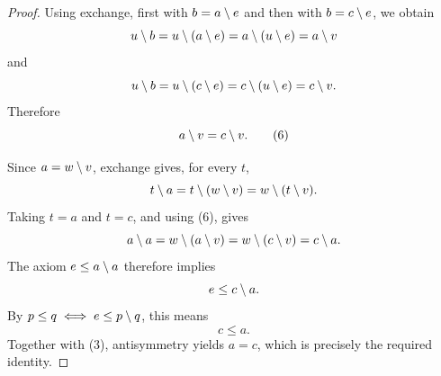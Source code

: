 \documentclass{article}
\theoremstyle{definition}
\begin{document}
\begin{proof}
Using exchange, first with \(b=a\res e\) and then with
\(b=c\res e\), we obtain
\[
u\res b
 =u\res(a\res e)
 =a\res(u\res e)
 =a\res v
\]
and
\[
u\res b
 =u\res(c\res e)
 =c\res(u\res e)
 =c\res v.
\]
Therefore
\begin{equation}
a\res v=c\res v.
\tag{6}
\end{equation}

Since \(a=w\res v\), exchange gives, for every \(t\),
\[
t\res a
 =t\res(w\res v)
 =w\res(t\res v).
\]
Taking \(t=a\) and \(t=c\), and using (6), gives
\[
a\res a
 =w\res(a\res v)
 =w\res(c\res v)
 =c\res a.
\]
The axiom \(e\leq a\res a\) therefore implies
\[
e\leq c\res a.
\]
By \(p\leq q\iff e\leq p\res q\), this means
\[
c\leq a.
\]
Together with (3), antisymmetry yields \(a=c\), which is precisely
the required identity.
\end{proof}
\end{document}
